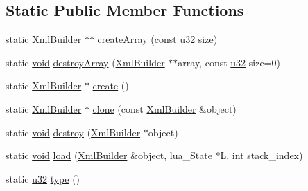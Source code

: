 \subsection*{Static Public Member Functions}
\begin{DoxyCompactItemize}
\item 
static \mbox{\hyperlink{classnjli_1_1_xml_builder}{Xml\+Builder}} $\ast$$\ast$ \mbox{\hyperlink{classnjli_1_1_xml_builder_aed042470b666dc03e23109134351b06b}{create\+Array}} (const \mbox{\hyperlink{_util_8h_a10e94b422ef0c20dcdec20d31a1f5049}{u32}} size)
\item 
static \mbox{\hyperlink{_thread_8h_af1e856da2e658414cb2456cb6f7ebc66}{void}} \mbox{\hyperlink{classnjli_1_1_xml_builder_a40786e323c4f939eeb024002bad0e156}{destroy\+Array}} (\mbox{\hyperlink{classnjli_1_1_xml_builder}{Xml\+Builder}} $\ast$$\ast$array, const \mbox{\hyperlink{_util_8h_a10e94b422ef0c20dcdec20d31a1f5049}{u32}} size=0)
\item 
static \mbox{\hyperlink{classnjli_1_1_xml_builder}{Xml\+Builder}} $\ast$ \mbox{\hyperlink{classnjli_1_1_xml_builder_a826d245450f9ea12dac8e1ebabefcb3d}{create}} ()
\item 
static \mbox{\hyperlink{classnjli_1_1_xml_builder}{Xml\+Builder}} $\ast$ \mbox{\hyperlink{classnjli_1_1_xml_builder_adf09f255cd5bbee5c8d44162c18fc9f9}{clone}} (const \mbox{\hyperlink{classnjli_1_1_xml_builder}{Xml\+Builder}} \&object)
\item 
static \mbox{\hyperlink{_thread_8h_af1e856da2e658414cb2456cb6f7ebc66}{void}} \mbox{\hyperlink{classnjli_1_1_xml_builder_a93f26e2678915d16446b560854d104ce}{destroy}} (\mbox{\hyperlink{classnjli_1_1_xml_builder}{Xml\+Builder}} $\ast$object)
\item 
static \mbox{\hyperlink{_thread_8h_af1e856da2e658414cb2456cb6f7ebc66}{void}} \mbox{\hyperlink{classnjli_1_1_xml_builder_a8d562b0880419cbca7768aff257bd07e}{load}} (\mbox{\hyperlink{classnjli_1_1_xml_builder}{Xml\+Builder}} \&object, lua\+\_\+\+State $\ast$L, int stack\+\_\+index)
\item 
static \mbox{\hyperlink{_util_8h_a10e94b422ef0c20dcdec20d31a1f5049}{u32}} \mbox{\hyperlink{classnjli_1_1_xml_builder_ae82ac8b0e656f4f212d447ef1e9c3526}{type}} ()
\end{DoxyCompactItemize}
